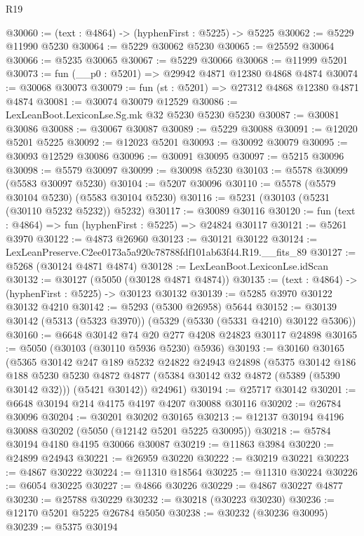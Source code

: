 \begin{lexlean}{R19}
\begin{coremodule}
@30060 := (text : @4864) -> (hyphenFirst : @5225) -> @5225
@30062 := @5229 @11990 @5230
@30064 := @5229 @30062 @5230
@30065 := @25592 @30064
@30066 := @5235 @30065
@30067 := @5229 @30066
@30068 := @11999 @5201
@30073 := fun (__p0 : @5201) => @29942 @4871 @12380 @4868 @4874
@30074 := @30068 @30073
@30079 := fun (st : @5201) => @27312 @4868 @12380 @4871 @4874
@30081 := @30074 @30079 @12529
@30086 := LexLeanBoot.LexiconLse.Sg.mk @32 @5230 @5230 @5230
@30087 := @30081 @30086
@30088 := @30067 @30087
@30089 := @5229 @30088
@30091 := @12020 @5201 @5225
@30092 := @12023 @5201
@30093 := @30092 @30079
@30095 := @30093 @12529 @30086
@30096 := @30091 @30095
@30097 := @5215 @30096
@30098 := @5579 @30097
@30099 := @30098 @5230
@30103 := @5578 @30099 (@5583 @30097 @5230)
@30104 := @5207 @30096
@30110 := @5578 (@5579 @30104 @5230) (@5583 @30104 @5230)
@30116 := @5231 (@30103 (@5231 (@30110 @5232 @5232)) @5232)
@30117 := @30089 @30116
@30120 := fun (text : @4864) => fun (hyphenFirst : @5225) => @24824 @30117
@30121 := @5261 @3970
@30122 := @4873 @26960
@30123 := @30121 @30122
@30124 := LexLeanPreserve.C2ee0173a5a920c78788fdf101ab63f44.R19.__fits_89
@30127 := @5268 (@30124 @4871 @4874)
@30128 := LexLeanBoot.LexiconLse.idScan
@30132 := @30127 (@5050 (@30128 @4871 @4874))
@30135 := (text : @4864) -> (hyphenFirst : @5225) -> @30123 @30132
@30139 := @5285 @3970 @30122 @30132 @4210
@30142 := @5293 (@5300 @26958) @5644
@30152 := @30139 @30142 (@5313 (@5323 @3970)) (@5329 (@5330 (@5331 @4210) @30122 @5306))
@30160 := @6648 @30142 @74 @20 @277 @4208 @24823 @30117 @24898
@30165 := @5050 (@30103 (@30110 @5936 @5230) @5936)
@30193 := @30160
    @30165
    (@5365
      @30142
      @247
      @189
      @5232
      @24822
      @24943
      @24898
      (@5375
        @30142
        @186
        @188
        @5230
        @5230
        @4872
        @4877
        (@5384 @30142 @32 @4872 (@5389 (@5390 @30142 @32)))
        (@5421 @30142))
      @24961)
@30194 := @25717 @30142
@30201 := @6648 @30194 @214 @4175 @4197 @4207 @30088 @30116
@30202 := @26784 @30096
@30204 := @30201 @30202 @30165
@30213 := @12137 @30194 @4196 @30088 @30202 (@5050 (@12142 @5201 @5225 @30095))
@30218 := @5784 @30194 @4180 @4195 @30066 @30087
@30219 := @11863 @3984
@30220 := @24899 @24943
@30221 := @26959 @30220
@30222 := @30219 @30221
@30223 := @4867 @30222
@30224 := @11310 @18564
@30225 := @11310 @30224
@30226 := @6054 @30225
@30227 := @4866 @30226
@30229 := @4867 @30227 @4877
@30230 := @25788 @30229
@30232 := @30218 (@30223 @30230)
@30236 := @12170 @5201 @5225 @26784 @5050
@30238 := @30232 (@30236 @30095)
@30239 := @5375 @30194

\end{coremodule}
\end{lexlean}
